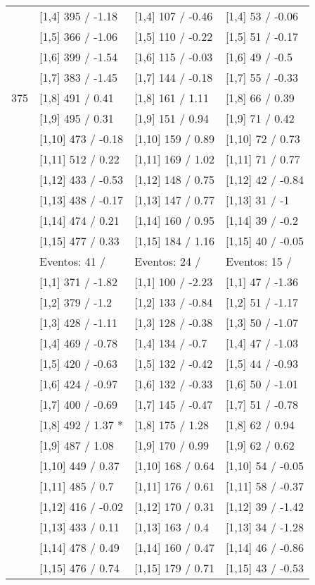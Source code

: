 \begin{table}
\begin{tabular}[t]{llll}
\addlinespace
 & {}[1,4] 395  / -1.18 & {}[1,4] 107  / -0.46 & {}[1,4] 53  / -0.06\\
 & {}[1,5] 366  / -1.06 & {}[1,5] 110  / -0.22 & {}[1,5] 51  / -0.17\\
 & {}[1,6] 399  / -1.54 & {}[1,6] 115  / -0.03 & {}[1,6] 49  / -0.5\\
 & {}[1,7] 383  / -1.45 & {}[1,7] 144  / -0.18 & {}[1,7] 55  / -0.33\\
375 & {}[1,8] 491  / 0.41 & {}[1,8] 161  / 1.11 & {}[1,8] 66  / 0.39\\
\addlinespace
 & {}[1,9] 495  / 0.31 & {}[1,9] 151  / 0.94 & {}[1,9] 71  / 0.42\\
 & {}[1,10] 473  / -0.18 & {}[1,10] 159  / 0.89 & {}[1,10] 72  / 0.73\\
 & {}[1,11] 512  / 0.22 & {}[1,11] 169  / 1.02 & {}[1,11] 71  / 0.77\\
 & {}[1,12] 433  / -0.53 & {}[1,12] 148  / 0.75 & {}[1,12] 42  / -0.84\\
 & {}[1,13] 438  / -0.17 & {}[1,13] 147  / 0.77 & {}[1,13] 31  / -1\\
\addlinespace
 & {}[1,14] 474  / 0.21 & {}[1,14] 160  / 0.95 & {}[1,14] 39  / -0.2\\
 & {}[1,15] 477  / 0.33 & {}[1,15] 184  / 1.16 & {}[1,15] 40  / -0.05\\
 & Eventos:  41 / & Eventos:  24 / & Eventos:  15 /\\
 & {}[1,1] 371  / -1.82 & {}[1,1] 100  / -2.23 & {}[1,1] 47  / -1.36\\
 & {}[1,2] 379  / -1.2 & {}[1,2] 133  / -0.84 & {}[1,2] 51  / -1.17\\
\addlinespace
 & {}[1,3] 428  / -1.11 & {}[1,3] 128  / -0.38 & {}[1,3] 50  / -1.07\\
 & {}[1,4] 469  / -0.78 & {}[1,4] 134  / -0.7 & {}[1,4] 47  / -1.03\\
 & {}[1,5] 420  / -0.63 & {}[1,5] 132  / -0.42 & {}[1,5] 44  / -0.93\\
 & {}[1,6] 424  / -0.97 & {}[1,6] 132  / -0.33 & {}[1,6] 50  / -1.01\\
 & {}[1,7] 400  / -0.69 & {}[1,7] 145  / -0.47 & {}[1,7] 51  / -0.78\\
\addlinespace
500 & {}[1,8] 492  / 1.37 * & {}[1,8] 175  / 1.28 & {}[1,8] 62  / 0.94\\
 & {}[1,9] 487  / 1.08 & {}[1,9] 170  / 0.99 & {}[1,9] 62  / 0.62\\
 & {}[1,10] 449  / 0.37 & {}[1,10] 168  / 0.64 & {}[1,10] 54  / -0.05\\
 & {}[1,11] 485  / 0.7 & {}[1,11] 176  / 0.61 & {}[1,11] 58  / -0.37\\
 & {}[1,12] 416  / -0.02 & {}[1,12] 170  / 0.31 & {}[1,12] 39  / -1.42\\
\addlinespace
 & {}[1,13] 433  / 0.11 & {}[1,13] 163  / 0.4 & {}[1,13] 34  / -1.28\\
 & {}[1,14] 478  / 0.49 & {}[1,14] 160  / 0.47 & {}[1,14] 46  / -0.86\\
 & {}[1,15] 476  / 0.74 & {}[1,15] 179  / 0.71 & {}[1,15] 43  / -0.53\\
\bottomrule
\end{tabular}
\end{table}
